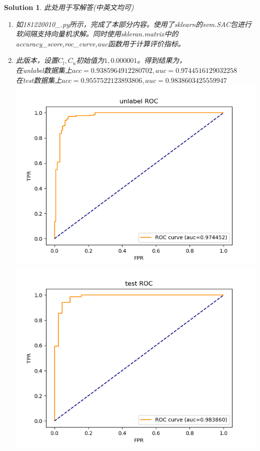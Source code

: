 \documentclass[a4paper,UTF8]{article}
\newtheorem*{solution}{Solution}
\numberwithin{equation}{section}
\begin{document}
\begin{solution}
此处用于写解答(中英文均可)
\begin{enumerate}
    \item 如181220010\_.py所示，完成了本部分内容。使用了sklearn的svm.SAC包进行软间隔支持向量机求解。同时使用skleran.matrix中的accuracy\_score,roc\_curve,auc函数用于计算评价指标。
    \item 此版本，设置$C_l,C_u$初始值为$1,0.000001$。得到结果为，\\
    在unlabel数据集上$acc=0.9385964912280702, auc=0.9744516129032258$\\
    在test数据集上$acc=0.9557522123893806, auc=0.9838603425559947$\\
    \includegraphics[scale=0.8]{figures/Figure_1.png}\\
    \includegraphics[scale=0.8]{figures/Figure_2.png}

\end{enumerate}
\end{solution}
\end{document}
